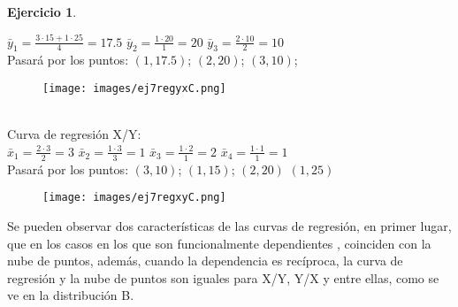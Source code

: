 \documentclass[a4paper, 12pt]{article}
\theoremstyle{definition}
\newtheorem{ej}{Ejercicio}
\begin{document}
\begin{ej}
\begin{enumerate}
        $\bar{y}_1 = \frac{3 \cdot 15 + 1 \cdot 25}{4} = 17.5$  $\bar{y}_2 = \frac{1 \cdot 20}{1} = 20$  $\bar{y}_3 = \frac{2 \cdot 10}{2} = 10$  \\
        Pasará por los puntos: $(1,17.5)$; $(2,20)$; $(3,10)$; \\
        \begin{figure}[h]
        	\centering
    	    \texttt{[image: images/ej7regyxC.png]}
        \end{figure} \\
        Curva de regresión X/Y: \\
        $\bar{x}_1 = \frac{2 \cdot 3}{2} = 3$  $\bar{x}_2 = \frac{1 \cdot 3}{3} = 1$  $\bar{x}_3 = \frac{1 \cdot 2}{1} = 2$ $\bar{x}_4 = \frac{1 \cdot 1}{1} = 1$\\ 
        Pasará por los puntos: $(3,10)$; $(1,15)$; $(2,20)$ $(1,25)$\\
        \begin{figure}[h]
        	\centering
    	    \texttt{[image: images/ej7regxyC.png]}
        \end{figure}
        \newpage
        
        
    Se pueden observar dos características de las curvas de regresión, en primer lugar, que en los casos en los que son funcionalmente dependientes , coinciden con la nube de puntos, además, cuando la dependencia es recíproca, la curva de regresión y la nube de puntos son iguales para X/Y, Y/X y entre ellas, como se ve en la distribución B.
    
\end{enumerate}
\end{ej}
 
\end{document}
